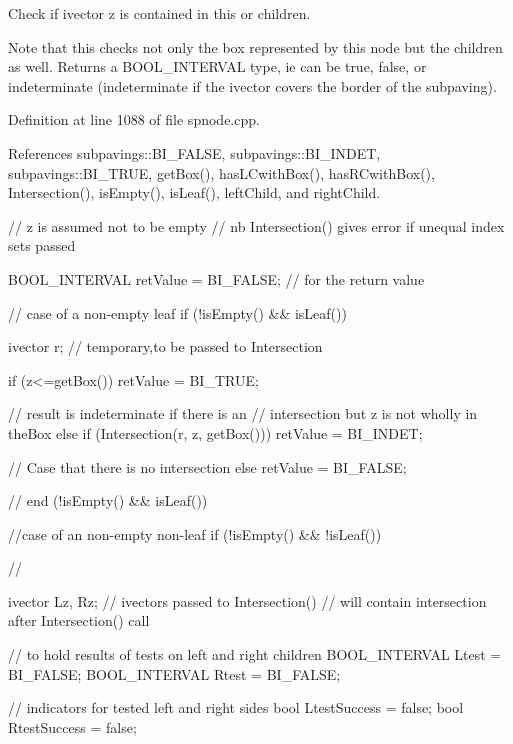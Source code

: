 \-Check if ivector z is contained in this or children. 

\-Note that this checks not only the box represented by this node but the children as well. \-Returns a \-B\-O\-O\-L\-\_\-\-I\-N\-T\-E\-R\-V\-A\-L type, ie can be true, false, or indeterminate (indeterminate if the ivector covers the border of the subpaving). 

\-Definition at line 1088 of file spnode.\-cpp.



\-References subpavings\-::\-B\-I\-\_\-\-F\-A\-L\-S\-E, subpavings\-::\-B\-I\-\_\-\-I\-N\-D\-E\-T, subpavings\-::\-B\-I\-\_\-\-T\-R\-U\-E, get\-Box(), has\-L\-Cwith\-Box(), has\-R\-Cwith\-Box(), \-Intersection(), is\-Empty(), is\-Leaf(), left\-Child, and right\-Child.


\begin{DoxyCode}
    {
        // z is assumed not to be empty
        // nb Intersection() gives error if unequal index sets passed

        BOOL_INTERVAL retValue = BI_FALSE; // for the return value

        // case of a non-empty leaf
        if (!isEmpty() && isLeaf()) {

            ivector r; // temporary,to be passed to Intersection

            if (z<=getBox()) {
                retValue = BI_TRUE;
            }

            // result is indeterminate if there is an
            // intersection but z is not wholly in theBox
            else if (Intersection(r, z, getBox())) {
                retValue = BI_INDET;
            }

            // Case that there is no intersection
            else retValue = BI_FALSE;

        } // end (!isEmpty() && isLeaf())

        //case of an non-empty non-leaf
        if (!isEmpty() && !isLeaf()) {
        //

            ivector Lz, Rz; // ivectors passed to Intersection()
            // will contain intersection after Intersection() call

            // to hold results of tests on left and right children
            BOOL_INTERVAL Ltest = BI_FALSE;
            BOOL_INTERVAL Rtest = BI_FALSE;

            // indicators for tested left and right sides
            bool LtestSuccess = false;
            bool RtestSuccess = false;

}}
\end{DoxyCode}
